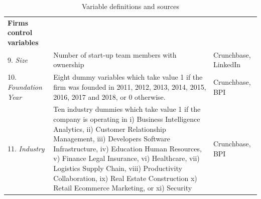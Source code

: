 \documentclass[12pt]{article}
\begin{document}
\begin{table} [ht]
\begin{tabularx}{\textwidth}{ p{5cm} p{7cm} p{2.2cm} }
\textbf{Firms control variables}& &\\
9. \textit{Size} & Number of start-up team members with ownership & Crunchbase, LinkedIn\\
10. \textit{Foundation Year} & Eight dummy variables which take value 1 if the firm was founded in 2011, 2012, 2013, 2014, 2015, 2016, 2017 and 2018, or 0 otherwise. & Crunchbase, BPI\\
11. \textit{Industry} & Ten industry dummies which take value 1 if the company is operating in i) Business Intelligence Analytics, ii) Customer Relationship Management, iii) Developers Software Infrastructure, iv) Education Human Resources, v) Finance Legal Insurance, vi) Healthcare, vii) Logistics Supply Chain, viii) Productivity Collaboration, ix) Real Estate Construction x) Retail Ecommerce Marketing, or xi) Security & Crunchbase, BPI \\
\cmidrule(r){1-3}
\end{tabularx}
\caption{Variable definitions and sources}
\label{table1}
\end{table}

\end{document}
